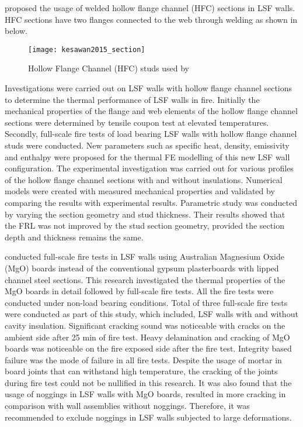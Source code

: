 \citet{Kesawan2015} proposed the usage of welded hollow flange channel (HFC) sections in LSF walls. HFC sections have two flanges connected to the web through welding as shown in below. 
\begin{figure}[htbp]
	\centering
		\texttt{[image: kesawan2015\_section]}		
		\caption{Hollow Flange Channel (HFC) studs used by \citet{Kesawan2015}}
		\label{fig:kesawan2015_test}
\end{figure}
Investigations were carried out on LSF walls with hollow flange channel sections to determine the thermal performance of LSF walls in fire. Initially the mechanical properties of the flange and web elements of the hollow flange channel sections were determined by tensile coupon test at elevated temperatures. Secondly, full-scale fire tests of load bearing LSF walls with hollow flange channel studs were conducted. New parameters such as specific heat, density, emissivity and enthalpy were proposed for the thermal FE modelling of this new LSF wall configuration. The experimental investigation was carried out for various profiles of the hollow flange channel sections with and without insulations. Numerical models were created with measured mechanical properties and validated by comparing the results with experimental results. Parametric study was conducted by varying the section geometry and stud thickness. Their results showed that the FRL was not improved by the stud section geometry, provided the section depth and thickness remains the same. 

\citet{Rusthi2017b} conducted full-scale fire tests in LSF walls using Australian Magnesium Oxide (MgO) boards instead of the conventional gypsum plasterboards with lipped channel steel sections. This research investigated the thermal properties of the MgO boards in detail followed by full-scale fire tests. All the fire tests were conducted under non-load bearing conditions. Total of three full-scale fire tests were conducted as part of this study, which included, LSF walls with and without cavity insulation. Significant cracking sound was noticeable with cracks on the ambient side after 25 min of fire test. Heavy delamination and cracking of MgO boards was noticeable on the fire exposed side after the fire test. Integrity based failure was the mode of failure in all fire tests. Despite the usage of mortar in board joints that can withstand high temperature, the cracking of the joints during fire test could not be nullified in this research. It was also found that the usage of noggings in LSF walls with MgO boards, resulted in more cracking in comparison with wall assemblies without noggings. Therefore, it was recommended to exclude noggings in LSF walls subjected to large deformations.

